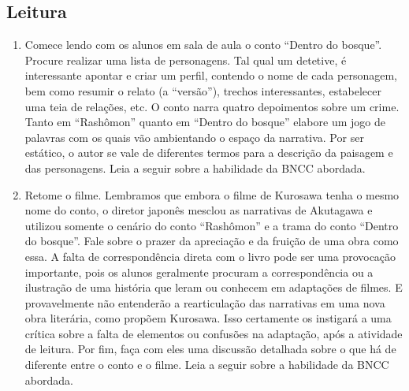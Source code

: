 \documentclass[12pt]{extarticle}
\begin{document}

\subsection{Leitura}

\begin{enumerate} 

\item Comece lendo com os alunos em sala de aula o
conto ``Dentro do bosque''.  Procure realizar uma lista de personagens.
Tal qual um detetive, é interessante apontar e criar um perfil, contendo
o nome de cada personagem, bem como resumir o relato (a ``versão''),
trechos interessantes, estabelecer uma teia de relações, etc.  O conto
narra quatro depoimentos sobre um crime. Tanto em ``Rashômon'' quanto em
``Dentro do bosque'' elabore um jogo de palavras com os quais vão ambientando
o espaço da narrativa. 
Por ser estático, o autor se vale de diferentes
termos para a descrição da paisagem e das personagens. 
Leia a seguir sobre a habilidade da BNCC abordada.



\item Retome o filme. Lembramos que embora o filme de Kurosawa tenha o mesmo
nome do conto, o diretor japonês mesclou as narrativas de Akutagawa e
utilizou somente o cenário do conto ``Rashômon'' e a trama do conto ``Dentro 
do bosque''. Fale sobre o prazer da apreciação e da fruição de uma obra como essa. 
A falta de correspondência direta com o livro pode ser uma
provocação importante, pois os alunos geralmente procuram a correspondência
ou a ilustração de uma história que leram ou conhecem em adaptações de
filmes. E provavelmente não entenderão a rearticulação das narrativas em
uma nova obra literária, como propõem Kurosawa. Isso certamente os
instigará a uma crítica sobre a falta de elementos ou confusões na
adaptação, após a atividade de leitura. Por fim, faça com eles uma
discussão detalhada sobre o que há de diferente entre o conto e o filme. 
Leia a seguir sobre a habilidade da BNCC abordada.

\end{enumerate}
 
\end{document}
